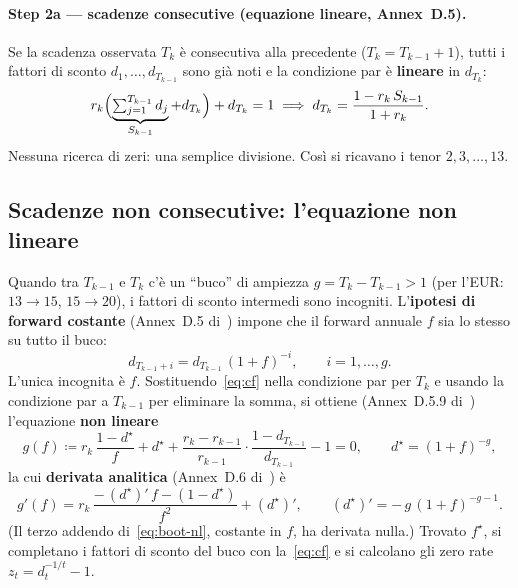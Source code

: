\documentclass[11pt,a4paper]{article}
\theoremstyle{plain}
\theoremstyle{definition}
\theoremstyle{remark}
\newcommand{\defeq}{\coloneqq}
\begin{document}
\paragraph{Step 2a --- scadenze consecutive (equazione lineare, Annex~D.5).}
Se la scadenza osservata $T_{k}$ \`e consecutiva alla precedente ($T_{k}=T_{k-1}+1$), tutti i
fattori di sconto $d_1,\dots,d_{T_{k-1}}$ sono gi\`a noti e la condizione par \`e
\textbf{lineare} in $d_{T_k}$:
\begin{equation}
  \label{eq:step2-lin}
  r_{k}\Bigl(\underbrace{\textstyle\sum_{j=1}^{T_{k-1}} d_j}_{S_{k-1}} + d_{T_k}\Bigr)
  + d_{T_k} = 1
  \;\Longrightarrow\;
  d_{T_k} = \frac{1 - r_{k}\,S_{k-1}}{1 + r_{k}}.
\end{equation}
Nessuna ricerca di zeri: una semplice divisione. Cos\`i si ricavano i tenor $2,3,\dots,13$.

\subsection{Scadenze non consecutive: l'equazione non lineare}
\label{sec:nonlin}

Quando tra $T_{k-1}$ e $T_k$ c'\`e un ``buco'' di ampiezza $g=T_k-T_{k-1}>1$ (per l'EUR:
$13\!\to\!15$, $15\!\to\!20$), i fattori di sconto intermedi sono incogniti. L'\textbf{ipotesi
di forward costante} (Annex~D.5 di~\cite{eiopa2026}) impone che il forward annuale $f$ sia lo
stesso su tutto il buco:
\begin{equation}
  \label{eq:cf}
  d_{T_{k-1}+i} = d_{T_{k-1}}\,(1+f)^{-i}, \qquad i=1,\ldots,g.
\end{equation}
L'unica incognita \`e $f$. Sostituendo~\eqref{eq:cf} nella condizione par per $T_k$ e usando
la condizione par a $T_{k-1}$ per eliminare la somma, si ottiene (Annex~D.5.9
di~\cite{eiopa2026}) l'equazione \textbf{non lineare}
\begin{equation}
  \label{eq:boot-nl}
  g(f) \defeq r_{k}\,\frac{1 - d^\star}{f}
            + d^\star
            + \frac{r_{k} - r_{k-1}}{r_{k-1}}\cdot\frac{1 - d_{T_{k-1}}}{d_{T_{k-1}}}
            - 1 = 0,
  \qquad d^\star = (1+f)^{-g},
\end{equation}
la cui \textbf{derivata analitica} (Annex~D.6 di~\cite{eiopa2026}) \`e
\begin{equation}
  \label{eq:boot-nl-der}
  g'(f) = r_{k}\,\frac{-\,(d^\star)'\,f - (1 - d^\star)}{f^2} + (d^\star)',
  \qquad (d^\star)' = -\,g\,(1+f)^{-g-1}.
\end{equation}
(Il terzo addendo di~\eqref{eq:boot-nl}, costante in $f$, ha derivata nulla.) Trovato
$f^\star$, si completano i fattori di sconto del buco con la~\eqref{eq:cf} e si calcolano gli
zero rate $z_t=d_t^{-1/t}-1$.
\end{document}
